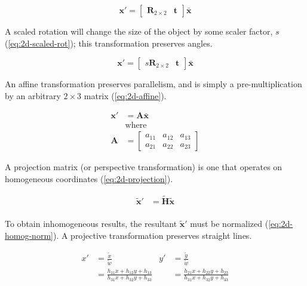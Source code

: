 \begin{equation}
    \mathbf{x}' = \begin{bmatrix}
        \mathbf{R}_{2 \times 2} & \mathbf{t}
    \end{bmatrix} \bar{\mathbf{x}}
    \label{eq:2d-rot-trans}
\end{equation}


A scaled rotation will change the size of the object by some scaler factor, $s$ (\cref{eq:2d-scaled-rot}); this transformation preserves angles.

\begin{equation}
    \mathbf{x}' = \begin{bmatrix}
        s\mathbf{R}_{2 \times 2} & \mathbf{t}
    \end{bmatrix}\bar{\mathbf{x}}
    \label{eq:2d-scaled-rot}
\end{equation}

An affine transformation preserves parallelism, and is simply a pre-multiplication by an arbitrary $2 \times 3$ matrix (\cref{eq:2d-affine}).

\begin{equation}
    \begin{aligned}
        \mathbf{x}' &= \mathbf{A\bar{x}}\\
        &\text{where}\\
        \mathbf{A} &= \begin{bmatrix}
            a_{11} & a_{12} & a_{13} \\ a_{21} & a_{22} & a_{23}
        \end{bmatrix}
    \end{aligned}
    \label{eq:2d-affine}
\end{equation}

A projection matrix (or perspective transformation) is one that operates on homogeneous coordinates (\cref{eq:2d-projection}).

\begin{equation}
    \begin{aligned}
        \tilde{\mathbf{x}}' &= \tilde{\mathbf{H}}\tilde{\mathbf{x}}\\
    \end{aligned}
    \label{eq:2d-projection}
\end{equation}

To obtain inhomogeneous results, the resultant $\tilde{\mathbf{x}}'$ must be normalized (\cref{eq:2d-homog-norm}). A projective transformation preserves straight lines.

\begin{equation}
    \begin{aligned}
        x'&= \frac{\tilde{x}}{\tilde{w}}  &  y' &= \frac{\tilde{y}}{\tilde{w}}\\
        &= \frac{h_{11}x + h_{12}y + h_{13}}{h_{31}x + h_{32}y + h_{33}} &  &= \frac{h_{21}x + h_{22}y + h_{23}}{h_{31}x + h_{32}y + h_{33}}
    \end{aligned}
    \label{eq:2d-homog-norm}
\end{equation}



